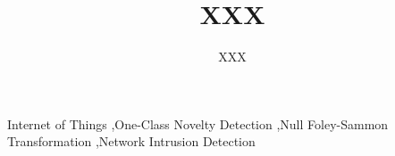 \documentclass[final,twocolumn,10pt]{elsarticle}
\begin{document}
\begin{frontmatter}

\title{XXX}
\author{XXX}
\address{}

\begin{abstract}



\end{abstract}


\begin{keyword}
Internet of Things  \sep One-Class Novelty Detection 
\sep Null Foley-Sammon Transformation 
\sep Network Intrusion Detection
\end{keyword}


\end{frontmatter}
\end{document}
